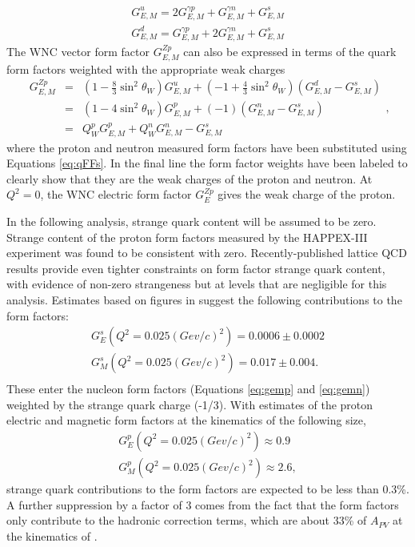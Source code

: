 \begin{align}
G_{E,M}^u=2G_{E,M}^{\gamma p}+G_{E,M}^{\gamma n}+G_{E,M}^{s}\\
G_{E,M}^d=G_{E,M}^{\gamma p}+2G_{E,M}^{\gamma n}+G_{E,M}^{s}
\label{eq:qFFs}
\end{align}
The WNC vector form factor $G_{E,M}^{Z p}$ can also be expressed in terms of the quark form factors weighted with the appropriate weak charges
\begin{equation}
\begin{array}{lcc}
G_{E,M}^{Zp}&=&\left(1-\frac{8}{3}\sin^2\theta_W\right)G_{E,M}^u+\left(-1+\frac{4}{3}\sin^2\theta_W\right)(G_{E,M}^d-G_{E,M}^s)\\
~&=&\left(1-4\sin^2\theta_W\right)G_{E,M}^p+(-1)(G_{E,M}^n-G_{E,M}^s)\\
~&=&Q_W^pG_{E,M}^p+Q_W^nG_{E,M}^n-G_{E,M}^s\end{array},
\label{eq:gemzp}
\end{equation}
where the proton and neutron measured form factors have been substituted using Equations \ref{eq:qFFs}. In the final line the form factor weights have been labeled to clearly show that they are the weak charges of the proton and neutron. At $Q^2=0$, the WNC electric form factor $G_{E}^{Zp}$ gives the weak charge of the proton. 

In the following analysis, strange quark content will be assumed to be zero. Strange content of the proton form factors measured by the HAPPEX-III experiment was found to be consistent with zero\cite{HAPPEX3}. Recently-published lattice QCD results provide even tighter constraints on form factor strange quark content, with evidence of non-zero strangeness but at levels that are negligible for this analysis\cite{Green2015}. Estimates based on figures in \cite{Green2015} suggest the following contributions to the form factors:
\begin{align}
G_E^s\left(Q^2=0.025(Gev/c)^2\right)=0.0006\pm0.0002\\
G_M^s\left(Q^2=0.025(Gev/c)^2\right)=0.017\pm0.004.\\
\end{align}
These enter the nucleon form factors (Equations \ref{eq:gemp} and \ref{eq:gemn}) weighted by the strange quark charge (-1/3). With estimates of the proton electric and magnetic form factors at the \Qs kinematics of the following size,
\begin{align*}
G_E^p\left(Q^2=0.025(Gev/c)^2\right)\approx 0.9\\
G_M^p\left(Q^2=0.025(Gev/c)^2\right)\approx 2.6,
\end{align*}
strange quark contributions to the form factors are expected to be less than 0.3\%. A further suppression by a factor of 3 comes from the fact that the form factors only contribute to the hadronic correction terms, which are about 33\% of $A_{PV}$ at the kinematics of \Q.

